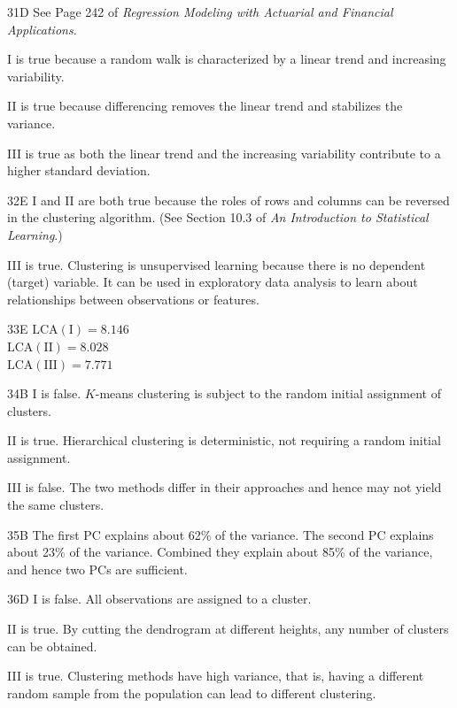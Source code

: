 \begin{solution}{31}{D}
See Page 242 of \textit{Regression Modeling with Actuarial and Financial Applications}.

I is true because a random walk is characterized by a linear trend and increasing variability.

II is true because differencing removes the linear trend and stabilizes the variance.

III is true as both the linear trend and the increasing variability contribute to a higher standard deviation.
\end{solution}

\begin{solution}{32}{E}
I and II are both true because the roles of rows and columns can be reversed in the clustering algorithm. (See Section 10.3 of \textit{An Introduction to Statistical Learning}.)

III is true. Clustering is unsupervised learning because there is no dependent (target) variable. It can be used in exploratory data analysis to learn about relationships between observations or features.
\end{solution}

\begin{solution}{33}{E}
$\mathrm{LCA(I)} = 8.146$ \\
$\mathrm{LCA(II)} = 8.028$ \\
$\mathrm{LCA(III)} = 7.771$
\end{solution}

\begin{solution}{34}{B}
I is false. $K$-means clustering is subject to the random initial assignment of clusters.

II is true. Hierarchical clustering is deterministic, not requiring a random initial assignment.

III is false. The two methods differ in their approaches and hence may not yield the same clusters.
\end{solution}

\begin{solution}{35}{B}
The first PC explains about 62\% of the variance. The second PC explains about 23\% of the variance. Combined they explain about 85\% of the variance, and hence two PCs are sufficient.
\end{solution}

\begin{solution}{36}{D}
I is false. All observations are assigned to a cluster.

II is true. By cutting the dendrogram at different heights, any number of clusters can be obtained.

III is true. Clustering methods have high variance, that is, having a different random sample from the population can lead to different clustering.
\end{solution}

